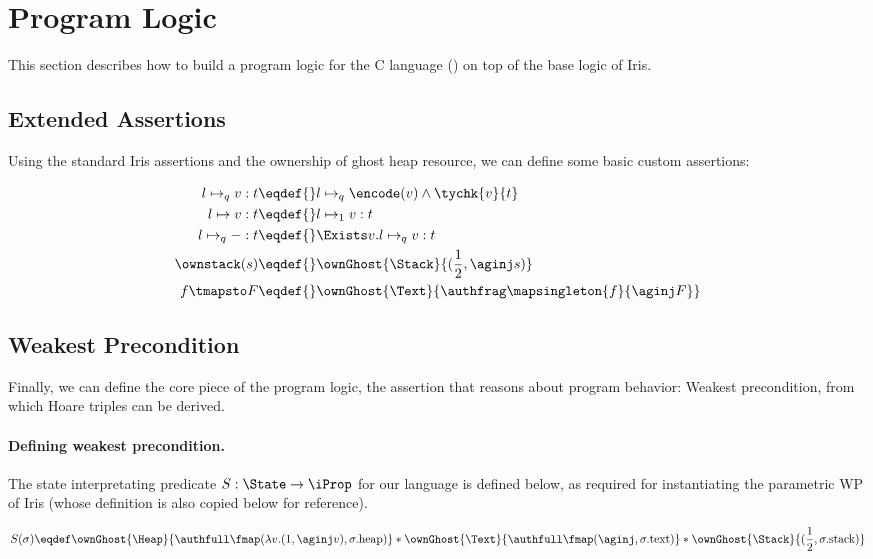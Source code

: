 \section{Program Logic}
\label{sec:program-logic}

This section describes how to build a program logic for the C language (\cf {}) on top of the base logic of Iris.

\subsection{Extended Assertions}

Using the standard Iris assertions and the ownership of ghost heap resource, we can define some basic custom assertions:

\begin{align*}
l \mapsto_q v : t \eqdef{}&  l \mapsto_q \encode(v) \land \tychk{v}{t} \\
l \mapsto v : t              \eqdef{}& l \mapsto_1 v : t\\
l \mapsto_q - : t            \eqdef{}& \Exists v. l \mapsto_q v : t\\
\ownstack(s) \eqdef{}& \ownGhost{\Stack}{(\frac12, \aginj s)} \\
f \tmapsto F \eqdef{}& \ownGhost{\Text}{\authfrag \mapsingleton{f}{\aginj F}}
\end{align*}

\subsection{Weakest Precondition}

Finally, we can define the core piece of the program logic, the assertion that reasons about program behavior:
Weakest precondition, from which Hoare triples can be derived.

\paragraph{Defining weakest precondition.}

The state interpretating predicate $S : \State \to \iProp$ for our \irisc{} language is defined below, as required for
instantiating the parametric WP of Iris (whose definition is also copied below for reference).

\[S(\sigma) \eqdef 
  \ownGhost{\Heap}{\authfull \fmap (\lambda v. (1, \aginj v), \sigma.\text{heap})} *
  \ownGhost{\Text}{\authfull \fmap (\aginj, \sigma.\text{text})} *
  \ownGhost{\Stack}{(\frac12, \sigma.\text{stack})}
\]

